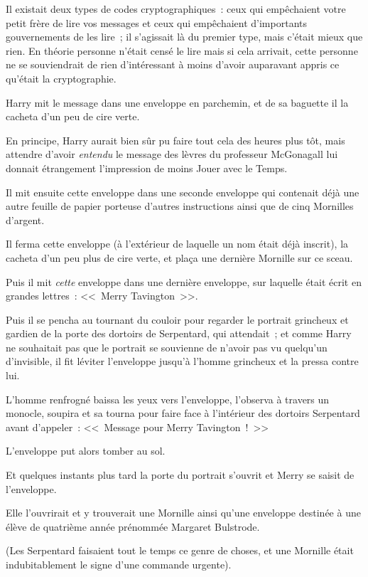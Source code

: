 Il existait deux types de codes cryptographiques~: ceux qui empêchaient votre petit frère de lire vos messages et ceux qui empêchaient d'importants gouvernements de les lire~; il s'agissait là du premier type, mais c'était mieux que rien. En théorie personne n'était censé le lire mais si cela arrivait, cette personne ne se souviendrait de rien d'intéressant à moins d'avoir auparavant appris ce qu'était la cryptographie.

Harry mit le message dans une enveloppe en parchemin, et de sa baguette il la cacheta d'un peu de cire verte.

En principe, Harry aurait bien sûr pu faire tout cela des heures plus tôt, mais attendre d'avoir \emph{entendu} le message des lèvres du professeur McGonagall lui donnait étrangement l'impression de moins Jouer avec le Temps.

Il mit ensuite cette enveloppe dans une seconde enveloppe qui contenait déjà une autre feuille de papier porteuse d'autres instructions ainsi que de cinq Mornilles d'argent.

Il ferma cette enveloppe (à l'extérieur de laquelle un nom était déjà inscrit), la cacheta d'un peu plus de cire verte, et plaça une dernière Mornille sur ce sceau.

Puis il mit \emph{cette} enveloppe dans une dernière enveloppe, sur laquelle était écrit en grandes lettres~: <<~Merry Tavington~>>.

Puis il se pencha au tournant du couloir pour regarder le portrait grincheux et gardien de la porte des dortoirs de Serpentard, qui attendait~; et comme Harry ne souhaitait pas que le portrait se souvienne de n'avoir pas vu quelqu'un d'invisible, il fit léviter l'enveloppe jusqu'à l'homme grincheux et la pressa contre lui.

L'homme renfrogné baissa les yeux vers l'enveloppe, l'observa à travers un monocle, soupira et sa tourna pour faire face à l'intérieur des dortoirs Serpentard avant d'appeler~: <<~Message pour Merry Tavington~!~>>

L'enveloppe put alors tomber au sol.

Et quelques instants plus tard la porte du portrait s'ouvrit et Merry se saisit de l'enveloppe.

Elle l'ouvrirait et y trouverait une Mornille ainsi qu'une enveloppe destinée à une élève de quatrième année prénommée Margaret Bulstrode.

(Les Serpentard faisaient tout le temps ce genre de choses, et une Mornille était indubitablement le signe d'une commande urgente).

